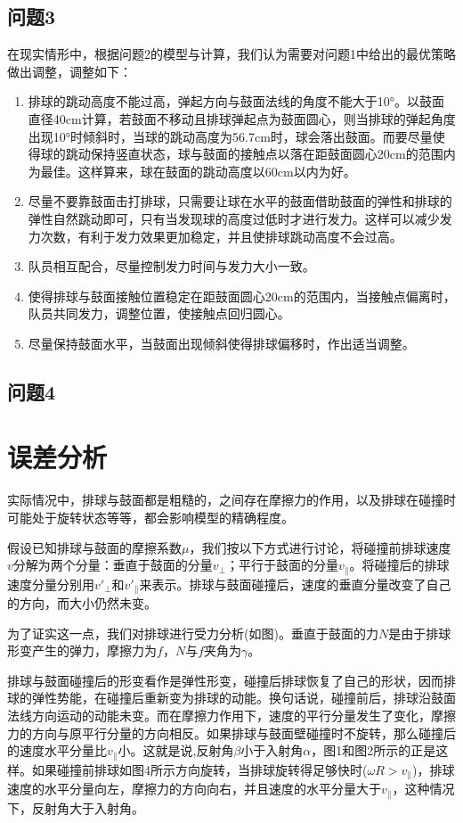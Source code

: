 \documentclass{cumcmthesis}
\begin{document}
\subsection{问题3}

在现实情形中，根据问题2的模型与计算，我们认为需要对问题1中给出的最优策略做出调整，调整如下：
\begin{enumerate}
\item 排球的跳动高度不能过高，弹起方向与鼓面法线的角度不能大于10°。以鼓面直径40cm计算，若鼓面不移动且排球弹起点为鼓面圆心，则当排球的弹起角度出现10°时倾斜时，当球的跳动高度为56.7cm时，球会落出鼓面。而要尽量使得球的跳动保持竖直状态，球与鼓面的接触点以落在距鼓面圆心20cm的范围内为最佳。这样算来，球在鼓面的跳动高度以60cm以内为好。
\item 尽量不要靠鼓面击打排球，只需要让球在水平的鼓面借助鼓面的弹性和排球的弹性自然跳动即可，只有当发现球的高度过低时才进行发力。这样可以减少发力次数，有利于发力效果更加稳定，并且使排球跳动高度不会过高。
\item 队员相互配合，尽量控制发力时间与发力大小一致。
\item 使得排球与鼓面接触位置稳定在距鼓面圆心20cm的范围内，当接触点偏离时，队员共同发力，调整位置，使接触点回归圆心。
\item 尽量保持鼓面水平，当鼓面出现倾斜使得排球偏移时，作出适当调整。
\end{enumerate}

\subsection{问题4}

\section{误差分析}
实际情况中，排球与鼓面都是粗糙的，之间存在摩擦力的作用，以及排球在碰撞时可能处于旋转状态等等，都会影响模型的精确程度。

假设已知排球与鼓面的摩擦系数$\mu$，我们按以下方式进行讨论，将碰撞前排球速度$v$分解为两个分量：垂直于鼓面的分量$v_\bot$；平行于鼓面的分量$v_\parallel$。将碰撞后的排球速度分量分别用$v'_\bot$和$v'_\parallel$来表示。排球与鼓面碰撞后，速度的垂直分量改变了自己的方向，而大小仍然未变。

为了证实这一点，我们对排球进行受力分析(如图)。垂直于鼓面的力$N$是由于排球形变产生的弹力，摩擦力为$f$，$N$与$f$夹角为$\gamma$。

排球与鼓面碰撞后的形变看作是弹性形变，碰撞后排球恢复了自己的形状，因而排球的弹性势能，在碰撞后重新变为排球的动能。换句话说，碰撞前后，排球沿鼓面法线方向运动的动能未变。而在摩擦力作用下，速度的平行分量发生了变化，摩擦力的方向与原平行分量的方向相反。如果排球与鼓面壁碰撞时不旋转，那么碰撞后的速度水平分量比$v_\parallel$小。这就是说,反射角$\beta$小于入射角$\alpha$，图1和图2所示的正是这样。如果碰撞前排球如图4所示方向旋转，当排球旋转得足够快时($\omega R>v_\parallel$)，排球速度的水平分量向左，摩擦力的方向向右，并且速度的水平分量大于$v_\parallel$，这种情况下，反射角大于入射角。
\end{document}
